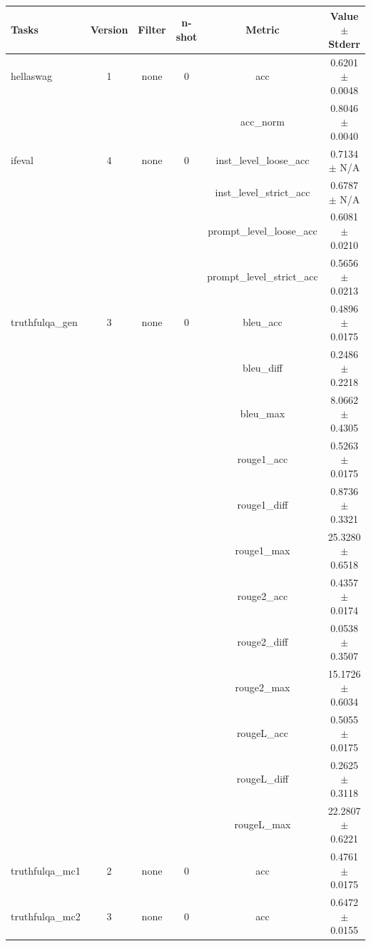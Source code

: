 \documentclass{ifacconf}
\begin{document}
\begin{strip}
\begin{minipage}{\textwidth}
    \begin{table}[H]
    \centering
    \begin{tabular}{|l|c|c|c|c|c|}
    \hline
    \textbf{Tasks} & \textbf{Version} & \textbf{Filter} & \textbf{n-shot} & \textbf{Metric} & \textbf{Value} $\pm$ \textbf{Stderr} \\ \hline
    hellaswag & 1 & none & 0 & acc & 0.6201 $\pm$ 0.0048 \\ \hline
    & & & & acc\_norm & 0.8046 $\pm$ 0.0040 \\ \hline
    ifeval & 4 & none & 0 & inst\_level\_loose\_acc & 0.7134 $\pm$ N/A \\ \hline
    & & & & inst\_level\_strict\_acc & 0.6787 $\pm$ N/A \\ \hline
    & & & & prompt\_level\_loose\_acc & 0.6081 $\pm$ 0.0210 \\ \hline
    & & & & prompt\_level\_strict\_acc & 0.5656 $\pm$ 0.0213 \\ \hline
    truthfulqa\_gen & 3 & none & 0 & bleu\_acc & 0.4896 $\pm$ 0.0175 \\ \hline
    & & & & bleu\_diff & 0.2486 $\pm$ 0.2218 \\ \hline
    & & & & bleu\_max & 8.0662 $\pm$ 0.4305 \\ \hline
    & & & & rouge1\_acc & 0.5263 $\pm$ 0.0175 \\ \hline
    & & & & rouge1\_diff & 0.8736 $\pm$ 0.3321 \\ \hline
    & & & & rouge1\_max & 25.3280 $\pm$ 0.6518 \\ \hline
    & & & & rouge2\_acc & 0.4357 $\pm$ 0.0174 \\ \hline
    & & & & rouge2\_diff & 0.0538 $\pm$ 0.3507 \\ \hline
    & & & & rouge2\_max & 15.1726 $\pm$ 0.6034 \\ \hline
    & & & & rougeL\_acc & 0.5055 $\pm$ 0.0175 \\ \hline
    & & & & rougeL\_diff & 0.2625 $\pm$ 0.3118 \\ \hline
    & & & & rougeL\_max & 22.2807 $\pm$ 0.6221 \\ \hline
    truthfulqa\_mc1 & 2 & none & 0 & acc & 0.4761 $\pm$ 0.0175 \\ \hline
    truthfulqa\_mc2 & 3 & none & 0 & acc & 0.6472 $\pm$ 0.0155 \\ \hline
    \end{tabular}
    \label{tab:qwen25_q8}
    \end{table}
\end{minipage}
\end{strip}
\end{document}
